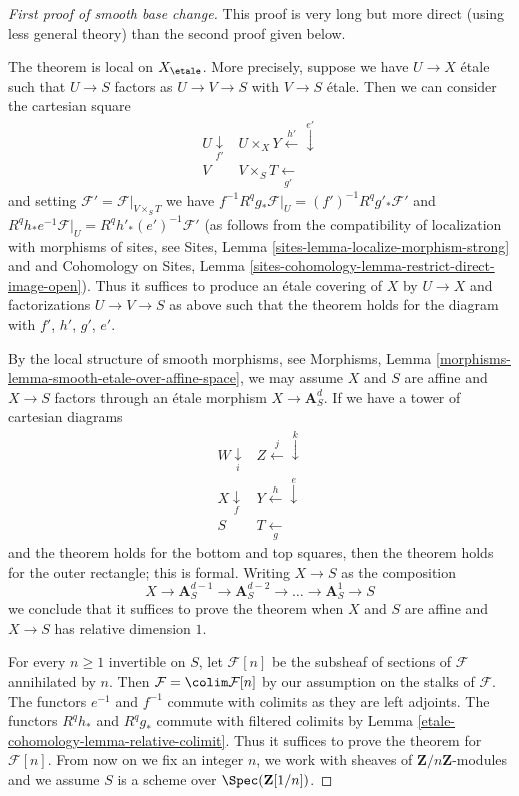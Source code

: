 \begin{proof}[First proof of smooth base change]
This proof is very long but more direct (using less general theory)
than the second proof given below.

\medskip\noindent
The theorem is local on $X_\etale$. More precisely, suppose we have
$U \to X$ \'etale such that $U \to S$ factors as $U \to V \to S$
with $V \to S$ \'etale. Then we can consider the cartesian square
$$
\begin{array}{cc}U \underset{f'}{\downarrow} & U \times_X Y \overset{h'}{\longleftarrow}\overset{e'}{\downarrow} \\ V & V \times_S T \underset{g'}{\longleftarrow}\end{array}
$$
and setting $\mathcal{F}' = \mathcal{F}|_{V \times_S T}$
we have $f^{-1}R^qg_*\mathcal{F}|_U = (f')^{-1}R^qg'_*\mathcal{F}'$
and $R^qh_*e^{-1}\mathcal{F}|_U = R^qh'_*(e')^{-1}\mathcal{F}'$
(as follows from the compatibility of localization with morphisms of sites, see
Sites, Lemma \ref{sites-lemma-localize-morphism-strong} and
and
Cohomology on Sites, Lemma
\ref{sites-cohomology-lemma-restrict-direct-image-open}).
Thus it suffices to produce an \'etale covering of $X$ by
$U \to X$ and factorizations $U \to V \to S$
as above such that the theorem holds for the diagram with
$f'$, $h'$, $g'$, $e'$.

\medskip\noindent
By the local structure of smooth morphisms, see
Morphisms, Lemma \ref{morphisms-lemma-smooth-etale-over-affine-space},
we may assume $X$ and $S$ are affine and $X \to S$
factors through an \'etale morphism $X \to \mathbf{A}^d_S$.
If we have a tower of cartesian diagrams
$$
\begin{array}{cc}W \underset{i}{\downarrow} & Z \overset{j}{\longleftarrow}\overset{k}{\downarrow} \\ X \underset{f}{\downarrow} & Y \overset{h}{\longleftarrow}\overset{e}{\downarrow} \\ S & T \underset{g}{\longleftarrow}\end{array}
$$
and the theorem holds for the bottom and top squares, then
the theorem holds for the outer rectangle; this is formal.
Writing $X \to S$ as the composition
$$
X \to \mathbf{A}^{d - 1}_S \to \mathbf{A}^{d - 2}_S \to \ldots \to
\mathbf{A}^1_S \to S
$$
we conclude that it suffices to prove the theorem when $X$ and $S$
are affine and $X \to S$ has relative dimension $1$.

\medskip\noindent
For every $n \geq 1$ invertible on $S$, let $\mathcal{F}[n]$
be the subsheaf of sections of $\mathcal{F}$ annihilated by $n$. Then
$\mathcal{F} = \colim \mathcal{F}[n]$ by our assumption on
the stalks of $\mathcal{F}$. The functors $e^{-1}$ and $f^{-1}$
commute with colimits as they are left adjoints. The functors
$R^qh_*$ and $R^qg_*$ commute with filtered colimits by
Lemma \ref{etale-cohomology-lemma-relative-colimit}.
Thus it suffices to prove the theorem for $\mathcal{F}[n]$.
From now on we fix an integer $n$, we work with
sheaves of $\mathbf{Z}/n\mathbf{Z}$-modules and
we assume $S$ is a scheme over $\Spec(\mathbf{Z}[1/n])$.


\end{proof}
